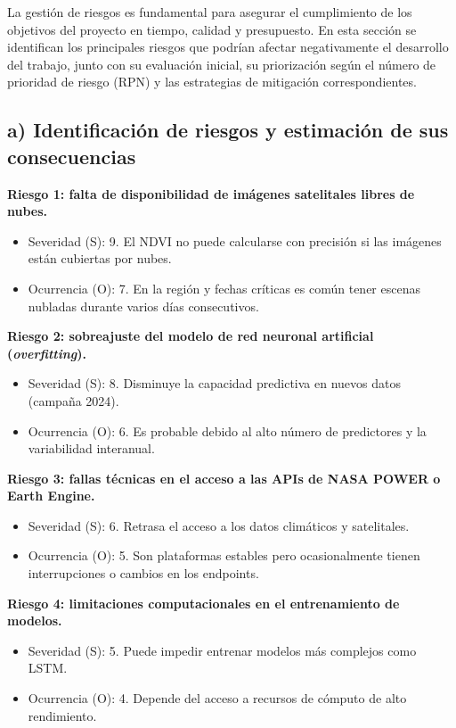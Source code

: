 \documentclass[
11pt, %
]{charter}
\begin{document}
La gestión de riesgos es fundamental para asegurar el cumplimiento de los objetivos del proyecto en tiempo, calidad y presupuesto. En esta sección se identifican los principales riesgos que podrían afectar negativamente el desarrollo del trabajo, junto con su evaluación inicial, su priorización según el número de prioridad de riesgo (RPN) y las estrategias de mitigación correspondientes.

\subsection*{a) Identificación de riesgos y estimación de sus consecuencias}

\textbf{Riesgo 1: falta de disponibilidad de imágenes satelitales libres de nubes.}
\begin{itemize}
    \item Severidad (S): 9. El NDVI no puede calcularse con precisión si las imágenes están cubiertas por nubes.
    \item Ocurrencia (O): 7. En la región y fechas críticas es común tener escenas nubladas durante varios días consecutivos.
\end{itemize}

\textbf{Riesgo 2: sobreajuste del modelo de red neuronal artificial (\textit{overfitting}).}
\begin{itemize}
    \item Severidad (S): 8. Disminuye la capacidad predictiva en nuevos datos (campaña 2024).
    \item Ocurrencia (O): 6. Es probable debido al alto número de predictores y la variabilidad interanual.
\end{itemize}

\textbf{Riesgo 3: fallas técnicas en el acceso a las APIs de NASA POWER o Earth Engine.}
\begin{itemize}
    \item Severidad (S): 6. Retrasa el acceso a los datos climáticos y satelitales.
    \item Ocurrencia (O): 5. Son plataformas estables pero ocasionalmente tienen interrupciones o cambios en los endpoints.
\end{itemize}

\textbf{Riesgo 4: limitaciones computacionales en el entrenamiento de modelos.}
\begin{itemize}
    \item Severidad (S): 5. Puede impedir entrenar modelos más complejos como LSTM.
    \item Ocurrencia (O): 4. Depende del acceso a recursos de cómputo de alto rendimiento.
\end{itemize}
\end{document}
